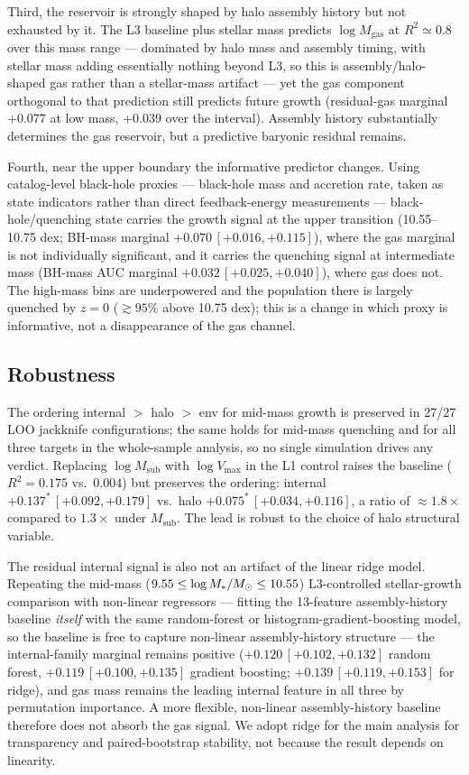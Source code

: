 \documentclass[twocolumn,linenumbers]{aastex701}
\newcommand{\logM}{\log M_*}
\begin{document}
Third, the reservoir is strongly shaped by halo assembly history but not
exhausted by it. The L3 baseline plus stellar mass predicts
$\log M_\mathrm{gas}$ at $R^2 \simeq 0.8$ over this mass range --- dominated by
halo mass and assembly timing, with stellar mass adding essentially nothing beyond
L3, so this is assembly/halo-shaped gas rather than a stellar-mass artifact --- yet
the gas component orthogonal to that
prediction still predicts future growth (residual-gas marginal $+0.077$ at low
mass, $+0.039$ over the interval). Assembly history substantially determines the
gas reservoir, but a predictive baryonic residual remains.

Fourth, near the upper boundary the informative predictor changes. Using
catalog-level black-hole proxies --- black-hole mass and accretion rate, taken
as state indicators rather than direct feedback-energy measurements ---
black-hole/quenching state carries the growth signal at the upper transition
(10.55--10.75 dex; BH-mass marginal $+0.070\,[+0.016, +0.115]$), where the gas
marginal is not individually significant, and it carries the quenching signal at
intermediate mass (BH-mass AUC marginal $+0.032\,[+0.025, +0.040]$), where gas
does not. The high-mass bins are underpowered and the population there is largely
quenched by $z = 0$ ($\gtrsim 95\%$ above 10.75 dex); this is a change in which
proxy is informative, not a disappearance of the gas channel.

\subsection{Robustness}
\label{sec:robustness}

The ordering internal $>$ halo $>$ env for mid-mass growth is preserved
in 27/27 LOO jackknife configurations; the same holds for mid-mass
quenching and for all three targets in the whole-sample analysis, so no
single simulation drives any verdict.
Replacing $\log M_\mathrm{sub}$ with $\log V_\mathrm{max}$ in the L1
control raises the baseline ($R^2 = 0.175$ vs.\ $0.004$) but preserves
the ordering: internal $+0.137^*\,[+0.092, +0.179]$ vs.\ halo
$+0.075^*\,[+0.034, +0.116]$, a ratio of $\approx 1.8\times$ compared to
$1.3\times$ under $M_\mathrm{sub}$.
The lead is robust to the choice of halo structural variable.

The residual internal signal is also not an artifact of the linear ridge model.
Repeating the mid-mass ($\WindowLoL \le \logM/M_\odot \le \WindowHiL$)
L3-controlled stellar-growth comparison with non-linear regressors --- fitting the
13-feature assembly-history baseline \emph{itself} with the same random-forest or
histogram-gradient-boosting model, so the baseline is free to capture non-linear
assembly-history structure --- the internal-family marginal remains positive
($+0.120\,[+0.102, +0.132]$ random forest, $+0.119\,[+0.100, +0.135]$ gradient
boosting; $+0.139\,[+0.119, +0.153]$ for ridge), and gas mass remains the leading
internal feature in all three by permutation importance. A more flexible,
non-linear assembly-history baseline therefore does not absorb the gas signal. We adopt ridge for the main analysis for transparency
and paired-bootstrap stability, not because the result depends on linearity.
\end{document}
